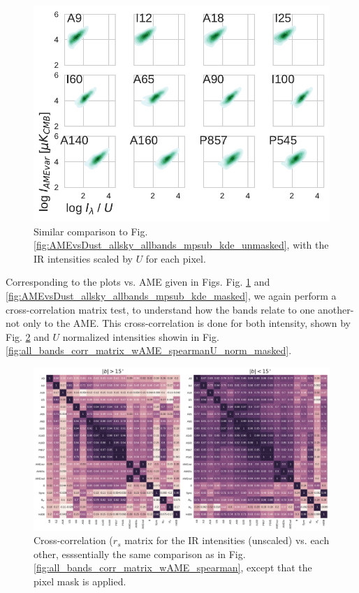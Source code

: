             \begin{figure}
              \includegraphics[width=\textwidth]{../Plots/ch_allsky/AMEvsDust_allsky_allbands_mpsub_UNorm_kde_masked.pdf}
              \centering
              \caption{Similar comparison to Fig. \ref{fig:AMEvsDust_allsky_allbands_mpsub_kde_unmasked}, with the IR intensities scaled by $U$ for each pixel. }
              \label{fig:AMEvsDust_allsky_allbands_mpsub_UNorm_kde_masked}
            \end{figure}
          Corresponding to the plots vs. AME given in Figs. Fig. \ref{fig:AMEvsDust_allsky_allbands_mpsub_UNorm_kde_masked} and \ref{fig:AMEvsDust_allsky_allbands_mpsub_kde_masked}, we again perform a cross-correlation matrix test, to understand how the bands relate to one another- not only to the AME. This cross-correlation is done for both intensity, shown by Fig. \ref{fig:all_bands_corr_matrix_wAME_spearmanintensity_maskall} and $U$ normalized intensities showin in Fig. \ref{fig:all_bands_corr_matrix_wAME_spearmanU_norm_masked}.
            \begin{figure}
              \includegraphics[width=\textwidth]{../Plots/ch_allsky/all_bands_corr_matrix_wAME_spearmanintensity_maskall.pdf}
              \centering
              \caption{Cross-correlation ($r_{s}$ matrix for the IR intensities (unscaled) vs. each other, esssentially the same comparison as in Fig. \ref{fig:all_bands_corr_matrix_wAME_spearman}, except that the pixel mask is applied.}
              \label{fig:all_bands_corr_matrix_wAME_spearmanintensity_maskall}
            \end{figure}
